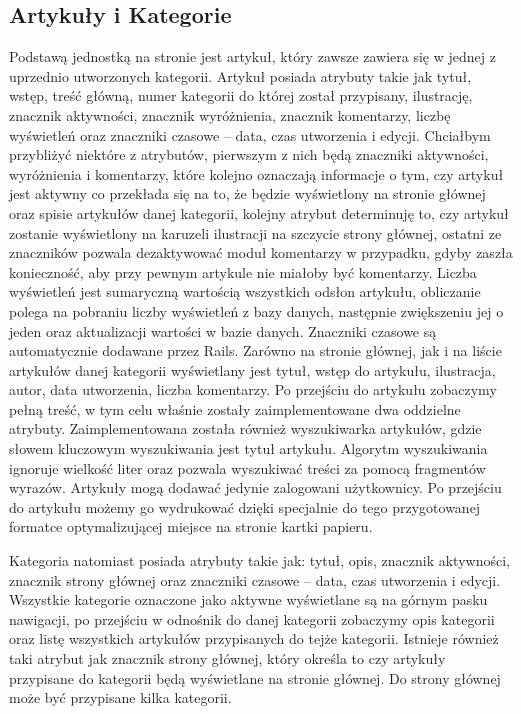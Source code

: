 \documentclass[openright]{xmgr}
\begin{document}
\subsection{Artykuły i Kategorie}
Podstawą jednostką na stronie jest artykuł, który zawsze zawiera się w jednej z uprzednio utworzonych kategorii. Artykuł posiada atrybuty takie jak tytuł, wstęp, treść główną, numer kategorii do której został przypisany, ilustrację, znacznik aktywności, znacznik wyróżnienia, znacznik komentarzy, liczbę wyświetleń oraz znaczniki czasowe – data, czas utworzenia i edycji. Chciałbym przybliżyć niektóre z atrybutów, pierwszym z nich będą znaczniki aktywności, wyróżnienia i komentarzy, które kolejno oznaczają informacje o tym, czy artykuł jest aktywny co przekłada się na to, że będzie wyświetlony na stronie głównej oraz spisie artykułów danej kategorii, kolejny atrybut determinuję to, czy artykuł zostanie wyświetlony na karuzeli ilustracji na szczycie strony głównej, ostatni ze znaczników pozwala dezaktywować moduł komentarzy w przypadku, gdyby zaszła konieczność, aby przy pewnym artykule nie miałoby być komentarzy. Liczba wyświetleń jest sumaryczną wartością wszystkich odsłon artykułu, obliczanie polega na pobraniu liczby wyświetleń z bazy danych, następnie zwiększeniu jej o jeden oraz aktualizacji wartości w bazie danych. Znaczniki czasowe są automatycznie dodawane przez Rails. Zarówno na stronie głównej, jak i na liście artykułów danej kategorii wyświetlany jest tytuł, wstęp do artykułu, ilustracja, autor, data utworzenia, liczba komentarzy. Po przejściu do artykułu zobaczymy pełną treść, w tym celu właśnie zostały zaimplementowane dwa oddzielne atrybuty. Zaimplementowana została również wyszukiwarka artykułów, gdzie słowem kluczowym wyszukiwania jest tytuł artykułu. Algorytm wyszukiwania ignoruje wielkość liter oraz pozwala wyszukiwać treści za pomocą fragmentów wyrazów. Artykuły mogą dodawać jedynie zalogowani użytkownicy. Po przejściu do artykułu możemy go wydrukować dzięki specjalnie do tego przygotowanej formatce optymalizującej miejsce na stronie kartki papieru.

Kategoria natomiast posiada atrybuty takie jak: tytuł, opis, znacznik aktywności, znacznik strony głównej oraz znaczniki czasowe – data, czas utworzenia i edycji. Wszystkie kategorie oznaczone jako aktywne wyświetlane są na górnym pasku nawigacji, po przejściu w odnośnik do danej kategorii zobaczymy opis kategorii oraz listę wszystkich artykułów przypisanych do tejże kategorii. Istnieje również taki atrybut jak znacznik strony głównej, który określa to czy artykuły przypisane do kategorii będą wyświetlane na stronie głównej. Do strony głównej może być przypisane kilka kategorii.
\end{document}

